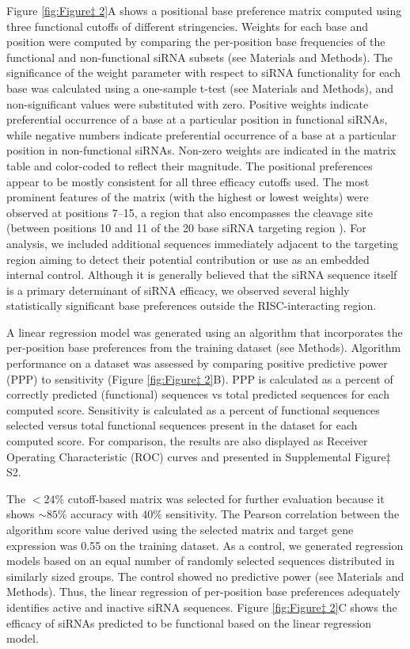 \documentclass{report}
\begin{document}
Figure \ref{fig:Figure‡ 2}A shows a positional base preference matrix computed using three functional cutoffs of different stringencies. Weights for each base and position were computed by comparing the per-position base frequencies of the functional and non-functional siRNA subsets (see Materials and Methods). The significance of the weight parameter with respect to siRNA functionality for each base was calculated using a one-sample t-test (see Materials and Methods), and non-significant values were substituted with zero. Positive weights indicate preferential occurrence of a base at a particular position in functional siRNAs, while negative numbers indicate preferential occurrence of a base at a particular position in non-functional siRNAs. Non-zero weights are indicated in the matrix table and color-coded to reflect their magnitude. The positional preferences appear to be mostly consistent for all three efficacy cutoffs used. The most prominent features of the matrix (with the highest or lowest weights) were observed at positions 7–15, a region that also encompasses the cleavage site (between positions 10 and 11 of the 20 base siRNA targeting region \cite{elbashir_functional_2001}). For analysis, we included additional sequences immediately adjacent to the targeting region aiming to detect their potential contribution or use as an embedded internal control. Although it is generally believed that the siRNA sequence itself is a primary determinant of siRNA efficacy, we observed several highly statistically significant base preferences outside the RISC-interacting region.

A linear regression model was generated using an algorithm that incorporates the per-position base preferences from the training dataset (see Methods). Algorithm performance on a dataset was assessed by comparing positive predictive power (PPP) to sensitivity (Figure \ref{fig:Figure‡ 2}B). PPP is calculated as a percent of correctly predicted (functional) sequences vs total predicted sequences for each computed score. Sensitivity is calculated as a percent of functional sequences selected versus total functional sequences present in the dataset for each computed score. For comparison, the results are also displayed as Receiver Operating Characteristic (ROC) curves and presented in Supplemental Figure‡ S2.

The $<24\%$ cutoff-based matrix was selected for further evaluation because it shows $\sim85\%$ accuracy with $40\%$ sensitivity. The Pearson correlation between the algorithm score value derived using the selected matrix and target gene expression was 0.55 on the training dataset. As a control, we generated regression models based on an equal number of randomly selected sequences distributed in similarly sized groups. The control showed no predictive power (see Materials and Methods). Thus, the linear regression of per-position base preferences adequately identifies active and inactive siRNA sequences. Figure \ref{fig:Figure‡ 2}C shows the efficacy of siRNAs predicted to be functional based on the linear regression model.
\end{document}
